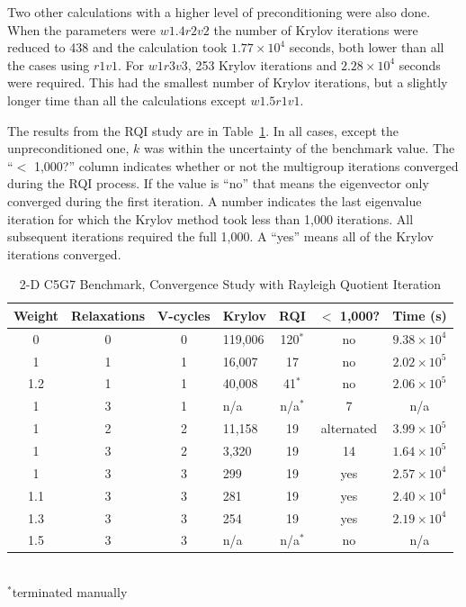 Two other calculations with a higher level of preconditioning were also done. When the parameters were $w1.4r2v2$ the number of Krylov iterations were reduced to 438 and the calculation took $1.77 \times 10^{4}$ seconds, both lower than all the cases using $r1v1$. For $w1r3v3$, 253 Krylov iterations and $2.28 \times 10^{4}$ seconds were required. This had the smallest number of Krylov iterations, but a slightly longer time than all the calculations except $w1.5r1v1$.	

The results from the RQI study are in Table~\ref{table:2-D c5g7 rqi}. In all cases, except the unpreconditioned one, $k$ was within the uncertainty of the benchmark value. The ``$<$ 1,000?'' column indicates whether or not the multigroup iterations converged during the RQI process. If the value is ``no'' that means the eigenvector only converged during the first iteration. A number indicates the last eigenvalue iteration for which the Krylov method took less than 1,000 iterations. All subsequent iterations required the full 1,000. A ``yes'' means all of the Krylov iterations converged.
%
\begin{table}[!h]
\caption{2-D C5G7 Benchmark, Convergence Study with Rayleigh Quotient Iteration}
\begin{center}
\begin{tabular}{| c | c | c | l | c | c | c |}
\hline
Weight & Relaxations & V-cycles & Krylov & RQI & $<$ 1,000? & Time (s) \\[0.5ex]
\hline
0    & 0 & 0 & 119,006 & 120$^{*}$ & no & $9.38 \times 10^{4}$ \\
1    & 1 & 1 & 16,007   & 17            & no & $2.02 \times 10^{5}$ \\
1.2 & 1 & 1 & 40,008   & 41$^{*}$   & no & $2.06 \times 10^{5}$ \\
1    & 3 & 1 & n/a         & n/a$^{*}$  & 7   & n/a \\
1    & 2 & 2 & 11,158   & 19            & alternated & $3.99 \times 10^{5}$ \\
1    & 3 & 2 & 3,320     & 19            & 14 & $1.64 \times 10^{5}$ \\
\hline
1    & 3 & 3 & 299        & 19            & yes & $2.57 \times 10^{4}$ \\
1.1 & 3 & 3 & 281        & 19            & yes & $2.40 \times 10^{4}$ \\
1.3 & 3 & 3 & 254        & 19            & yes & $2.19 \times 10^{4}$ \\
1.5 & 3 & 3 & n/a         & n/a$^{*}$ & no & n/a \\
\hline 
\end{tabular} \\
$^{*}$terminated manually
\end{center}
\label{table:2-D c5g7 rqi}
\end{table}
%

